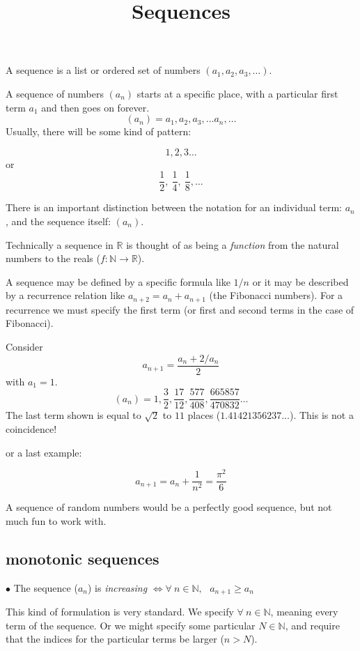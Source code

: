 \documentclass[11pt, oneside]{article}
\title{Sequences}
\date{}
\begin{document}
\maketitle
\Large

A sequence is a list or ordered set of numbers $(a_1, a_2, a_3, \dots)$.

A sequence of numbers $(a_n)$ starts at a specific place, with a particular first term $a_1$ and then goes on forever.
\[ (a_n) = a_1,  a_2, a_3, \dots a_n, \dots \]
Usually, there will be some kind of pattern:

\[ 1,2,3 \dots \]
or 
\[ \frac{1}{2}, \ \frac{1}{4}, \ \frac{1}{8}, \dots \]

There is an important distinction between the notation for an individual term:  $a_n$, and the sequence itself:  $(a_n)$.

Technically a sequence in $\mathbb{R}$ is thought of as being a \emph{function} from the natural numbers to the reals ($f : \mathbb{N} \rightarrow \mathbb{R}$).

A sequence may be defined by a specific formula like $1/n$ or it may be described by a recurrence relation like $a_{n+2} = a_n + a_{n+1}$ (the Fibonacci numbers).  For a recurrence we must specify the first term (or first and second terms in the case of Fibonacci).

Consider
\[ a_{n+1} = \frac{a_n + 2/a_n}{2} \]
with $a_1 = 1$.
\[ (a_n) = 1, \frac{3}{2}, \frac{17}{12}, \frac{577}{408}, \frac{665857}{470832} \dots \] 
The last term shown is equal to $\sqrt{2}$ to $11$ places ($1.41421356237 \dots$).  This is not a coincidence!

or a last example:

\[ a_{n+1} = a_n + \frac{1}{n^2} = \frac{\pi^2}{6} \]

A sequence of random numbers would be a perfectly good sequence, but not much fun to work with.

\subsection*{monotonic sequences}
$\bullet$  The sequence ($a_n$) is \emph{increasing} $\iff \forall \ n \in \mathbb{N}, \ \ \ a_{n+1} \ge a_n$

This kind of formulation is very standard.  We specify $\forall \ n \in \mathbb{N}$, meaning every term of the sequence.  Or we might specify some particular $N \in \mathbb{N}$, and require that the indices for the particular terms be larger ($n > N$).
\end{document}
